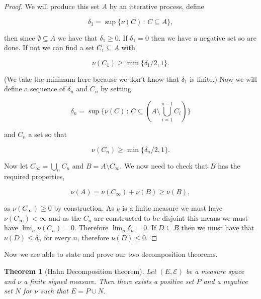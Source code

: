 \documentclass[
]{book}
\newtheorem{theorem}{Theorem}[chapter]
\theoremstyle{definition}
\theoremstyle{definition}
\theoremstyle{definition}
\theoremstyle{definition}
\theoremstyle{remark}
\begin{document}
\begin{proof}
We will produce this set \(A\) by an itterative process, define

\[ \delta_1 = \sup \{ \nu(C) \,:\, C \subseteq A\}, \]

then since \(\emptyset \subseteq A\) we have that \(\delta_1 \geq 0\). If \(\delta_1 = 0\) then we have a negative set so are done. If not we can find a set \(C_1 \subseteq A\) with

\[ \nu(C_1) \geq \min\{\delta_1/2 ,1\}. \]

(We take the minimum here because we don't know that \(\delta_1\) is finite.) Now we will define a sequence of \(\delta_n\) and \(C_n\) by setting

\[ \delta_n = \sup\{ \nu(C) \,:\, C \subseteq (A \setminus \bigcup_{i=1}^{n-1}C_i)\} \]

and \(C_n\) a set so that

\[ \nu(C_n) \geq \min\{ \delta_n /2 ,1\}. \]

Now let \(C_\infty = \bigcup_n C_n\) and \(B = A \setminus C_\infty\). We now need to check that \(B\) has the required properties,

\[ \nu(A) = \nu(C_\infty) + \nu(B) \geq \nu(B), \]

as \(\nu(C_\infty) \geq 0\) by construction.
As \(\nu\) is a finite measure we must have \(\nu(C_\infty) < \infty\) and as the \(C_n\) are constructed to be disjoint this means we must have \(\lim_n \nu(C_n) = 0\). Therefore \(\lim_n \delta_n = 0\). If \(D \subseteq B\) then we must have that \(\nu(D) \leq \delta_n\) for every \(n\), therefore \(\nu(D) \leq 0\).
\end{proof}

Now we are able to state and prove our two decomposition theorems.

\begin{theorem}[Hahn Decomposition theorem]
Let \((E, \mathcal{E})\) be a measure space and \(\nu\) a finite signed measure. Then there exists a positive set \(P\) and a negative set \(N\) for \(\nu\) such that \(E = P \cup N\).
\end{theorem}
\end{document}
